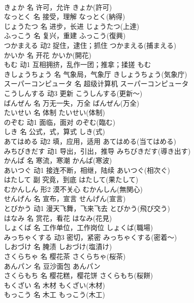 \documentclass[8pt]{extreport}
\begin{document}
\begin{CJK}{UTF8}{min}
\\	きょか	名	许可，允许	きょか(許可)	
\\	なっとく	名	接受，理解	なっとく(納得)	
\\	じょうたつ	名	进步，长进	じょうたつ(上達)	
\\	ふっこう	名	复兴，重建	ふっこう(復興)	
\\	つかまえる	动2	捉住，逮住；抓住	つかまえる(捕まえる)	
\\	かいか	名	开花	かいか(開花)	
\\	もむ	动1	互相拥挤，乱作一团；推拿；揉搓	もむ	
\\	きしょうちょう	名	气象局，气象厅	きしょうちょう(気象庁)	
\\	スーパーコンピュータ	名	超级计算机	スーパーコンピュータ	
\\	こうしんする	动3	更新	こうしんする(更新～)	
\\	ばんぜん	名	万无一失，万全	ばんぜん(万全)	
\\	たいせい	名	体制	たいせい(体制)	
\\	のぞむ	动1	面临，面对	のぞむ(臨む)	
\\	しき	名	公式，式，算式	しき(式)	
\\	あてはめる	动2	填，应用，适用	あてはめる(当てはめる)	
\\	みちびきだす	动1	导出，引出，推导	みちびきだす(導き出す)	
\\	かんぱ	名	寒流，寒潮	かんぱ(寒波)	
\\	あいつぐ	动1	接连不断，相继，陆续	あいつぐ(相次ぐ)	
\\	はたして	副	究竟，到底	はたして(果たして)	
\\	むかんしん	形2	漠不关心	むかんしん(無関心)	
\\	せんげん	名	宣布，宣言	せんげん(宣言)	
\\	とびかう	动1	漫天飞舞，飞来飞去	とびかう(飛び交う)	
\\	はなみ	名	赏花，看花	はなみ(花見)	
\\	しょくば	名	工作单位，工作岗位	しょくば(職場)	
\\	みっちゃくする	动3	密切，紧密	みっちゃくする(密着～)	
\\	しおづけ	名	腌渍	しおづけ(塩漬け)	
\\	さくらちゃ	名	樱花茶	さくらちゃ(桜茶)	
\\	あんパン	名	豆沙面包	あんパン	
\\	さくらもち	名	樱花糕，樱花饼	さくらもち(桜餅)	
\\	もくざい	名	木材	もくざい(木材)	
\\	もっこう	名	木工	もっこう(木工)	

\end{CJK}
\end{document}
